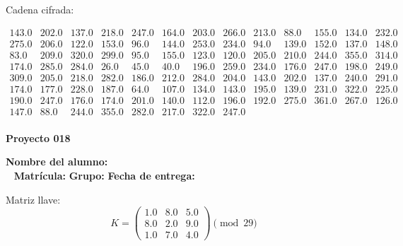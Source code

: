 \documentclass[12pt]{article}
\begin{document}
Cadena cifrada:
\begin{center}
$\begin{array}{lllllllllllll}
143.0 & 202.0 & 137.0 & 218.0 & 247.0 & 164.0 & 203.0 & 266.0 & 213.0 & 88.0 & 155.0 & 134.0 & 232.0\\
275.0 & 206.0 & 122.0 & 153.0 & 96.0 & 144.0 & 253.0 & 234.0 & 94.0 & 139.0 & 152.0 & 137.0 & 148.0\\
83.0 & 209.0 & 320.0 & 299.0 & 95.0 & 155.0 & 123.0 & 120.0 & 205.0 & 210.0 & 244.0 & 355.0 & 314.0\\
174.0 & 285.0 & 284.0 & 26.0 & 45.0 & 40.0 & 196.0 & 259.0 & 234.0 & 176.0 & 247.0 & 198.0 & 249.0\\
309.0 & 205.0 & 218.0 & 282.0 & 186.0 & 212.0 & 284.0 & 204.0 & 143.0 & 202.0 & 137.0 & 240.0 & 291.0\\
174.0 & 177.0 & 228.0 & 187.0 & 64.0 & 107.0 & 134.0 & 143.0 & 195.0 & 139.0 & 231.0 & 322.0 & 225.0\\
190.0 & 247.0 & 176.0 & 174.0 & 201.0 & 140.0 & 112.0 & 196.0 & 192.0 & 275.0 & 361.0 & 267.0 & 126.0\\
147.0 & 88.0 & 244.0 & 355.0 & 282.0 & 217.0 & 322.0 & 247.0\\
\end{array}$
\end{center}

\newpage


\textbf{Proyecto 018}

\textbf{Nombre del alumno:} \underline{\hspace{13cm}}\\\
\vspace{1cm}
\textbf{Matrícula:} \underline{\hspace{4cm}} \hspace{1cm}
\textbf{Grupo:} \underline{\hspace{2cm}}
\textbf{Fecha de entrega:} \underline{\hspace{2cm}}

\medskip

Matriz llave:
\[
K = \begin{pmatrix}
1.0 & 8.0 & 5.0\\
8.0 & 2.0 & 9.0\\
1.0 & 7.0 & 4.0
\end{pmatrix} \pmod{29}
\]
\end{document}
